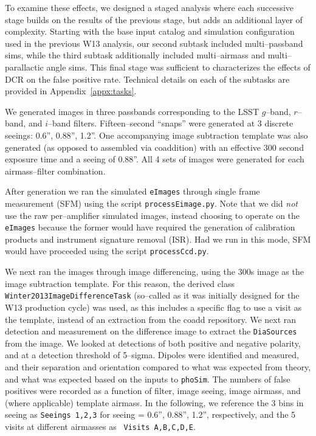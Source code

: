 \documentclass[prd, nofootinbib, floatfix, 11pt, tightenlines, times]{article}
\begin{document}
To examine these effects, we designed a staged analysis where each
successive stage builds on the results of the previous stage, but adds
an additional layer of complexity.  Starting with the base input
catalog and simulation configuration used in the previous W13
analysis, our second subtask included multi--passband sims, while the
third subtask additionally included multi--airmass and
multi--parallactic angle sims.  This final stage was sufficient to
characterizes the effects of DCR on the false positive rate.
Technical details on each of the subtasks are provided in
Appendix~\ref{appx:tasks}.

We generated images in three passbands corresponding to the LSST
$g$--band, $r$--band, and $i$--band filters.  Fifteen--second
``snaps'' were generated at 3 discrete seeings: 0.6'', 0.88'', 1.2''.
One accompanying image subtraction template was also generated (as
opposed to assembled via coaddition) with an effective 300 second
exposure time and a seeing of 0.88''.  All 4 sets of images were
generated for each airmass--filter combination.

After generation we ran the simulated {\tt eImages} through single
frame measurement (SFM) using the script {\tt processEimage.py}.  Note
that we did {\it not} use the raw per--amplifier simulated images,
instead choosing to operate on the {\tt eImages} because the former
would have required the generation of calibration products and
instrument signature removal (ISR).  Had we run in this mode, SFM
would have proceeded using the script {\tt processCcd.py}.

We next ran the images through image differencing, using the 300s
image as the image subtraction template.  For this reason, the derived
class {\tt Winter2013ImageDifferenceTask} (so--called as it was
initially designed for the W13 production cycle) was used, as this
includes a specific flag to use a visit as the template, instead of an
extraction from the coadd repository.  We next ran detection and
measurement on the difference image to extract the {\tt DiaSources}
from the image.  We looked at detections of both positive and negative
polarity, and at a detection threshold of 5--sigma.  Dipoles were
identified and measured, and their separation and orientation compared
to what was expected from theory, and what was expected based on the
inputs to {\tt phoSim}.  The numbers of false positives were recorded
as a function of filter, image seeing, image airmass, and (where
applicable) template airmass.  In the following, we reference the 3
bins in seeing as {\tt Seeings 1,2,3} for seeing = 0.6'', 0.88'',
1.2'', respectively, and the 5 visits at different airmasses as {\tt
  Visits A,B,C,D,E}.
\end{document}
